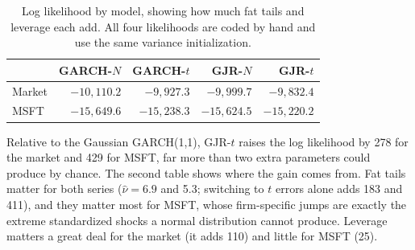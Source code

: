 \documentclass[11pt]{article}
\newcommand{\1}{\mathbf{1}}
\begin{document}
\begin{table}[!htb]
\centering
\small
\begin{tabular}{lrrrr}
\toprule
 & GARCH-$N$ & GARCH-$t$ & GJR-$N$ & GJR-$t$ \\
\midrule
Market & $-10{,}110.2$ & $-9{,}927.3$ & $-9{,}999.7$ & $-9{,}832.4$ \\
MSFT & $-15{,}649.6$ & $-15{,}238.3$ & $-15{,}624.5$ & $-15{,}220.2$ \\
\bottomrule
\end{tabular}
\caption{Log likelihood by model, showing how much fat tails and leverage each add. All four
likelihoods are coded by hand and use the same variance initialization.}
\end{table}

Relative to the Gaussian GARCH(1,1), GJR-$t$ raises the log likelihood by 278 for the market
and 429 for MSFT, far more than two extra parameters could produce by chance. The second
table shows where the gain comes from. Fat tails matter for both series ($\hat\nu=6.9$ and
5.3; switching to $t$ errors alone adds 183 and 411), and they matter most for MSFT, whose
firm-specific jumps are exactly the extreme standardized shocks a normal distribution cannot
produce. Leverage matters a great deal for the market (it adds 110) and little for MSFT (25).
\end{document}
